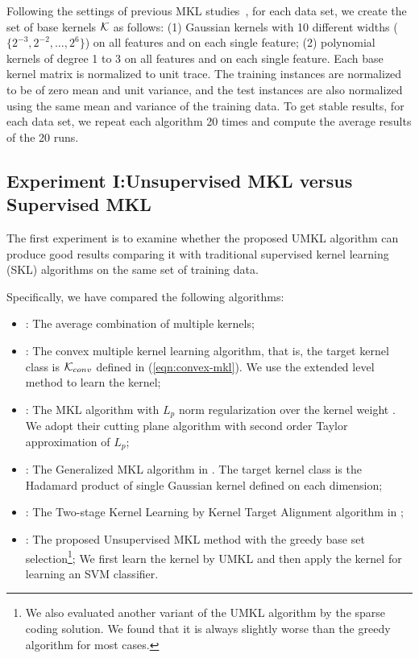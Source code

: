 Following the settings of previous MKL studies~\cite{nips/XuJKL08}, for each data set, we create the set of base kernels ${\mathcal K}$ as follows: %
(1) Gaussian kernels with 10 different widths ($\{2^{-3},2^{-2},\ldots,2^6\}$) on all features and on each single feature; (2) polynomial kernels of degree 1 to 3 on all features and on each single feature. Each base kernel matrix is normalized to unit trace. The training instances are normalized to be of zero mean and unit variance, and the test instances are also normalized using the same mean and variance of the training data. To get stable results, for each data set, we repeat each algorithm 20 times and compute the average results of the 20 runs.


\subsection{Experiment I:Unsupervised MKL versus Supervised MKL}

The first experiment is to examine whether the proposed UMKL algorithm can produce good results comparing it with traditional supervised kernel learning (SKL) algorithms on the same set of training data.

Specifically, we have compared the following algorithms:
\begin{itemize}
  \item []\hspace{-1cm}{\bf AvgKernel}: The average combination of multiple kernels;
  \item []: The convex multiple kernel learning algorithm, that is, the target
         kernel class is ${\mathcal K}_{conv}$ defined in (\ref{eqn:convex-mkl}). We use the
         extended level method \cite{nips/XuJKL08} to learn the kernel;
  \item []\hspace{-1cm}{\bf LpMKL}: The MKL algorithm with $L_p$ norm regularization over
        the kernel weight \cite{nips/KloftBSLMZ09}. We adopt their cutting plane
        algorithm with second order Taylor approximation of $L_p$;
  \item []\hspace{-1cm}{\bf GMKL}: The Generalized MKL algorithm in \cite{icml/VarmaB09}. The target kernel class is the Hadamard product of single Gaussian kernel defined on each dimension;
  \item[]\hspace{-1cm}{\bf KTA}: The Two-stage Kernel Learning by Kernel Target Alignment algorithm in \cite{icml/Cortes09};
    \item[]\hspace{-1cm}{\bf UMKL}: The proposed Unsupervised MKL method with the greedy base set selection\footnote{We also evaluated another variant of the UMKL algorithm by the sparse coding solution. We found that it is always slightly worse than the greedy algorithm for most cases.};  We first learn the kernel by UMKL and then apply the kernel for learning an SVM classifier.
\end{itemize}

